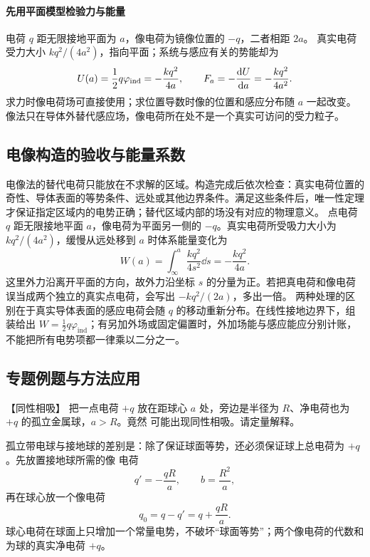 {%
\paragraph{先用平面模型检验力与能量}
电荷 $q$ 距无限接地平面为 $a$，像电荷为镜像位置的 $-q$，二者相距 $2a$。
真实电荷受力大小 $kq^2/(4a^2)$，指向平面；系统与感应有关的势能却为
\[
 U(a)=\frac12q\varphi_{\rm ind}=-\frac{kq^2}{4a},\qquad
 F_a=-\frac{\mathop{}\!\mathrm d U}{\mathop{}\!\mathrm d a}=-\frac{kq^2}{4a^2}.
\]
求力时像电荷场可直接使用；求位置导数时像的位置和感应分布随 $a$ 一起改变。像法只在导体外替代感应场，像电荷所在处不是一个真实可访问的受力粒子。


\subsection{电像构造的验收与能量系数}
电像法的替代电荷只能放在不求解的区域。构造完成后依次检查：真实电荷位置的奇性、导体表面的等势条件、远处或其他边界条件。满足这些条件后，唯一性定理才保证指定区域内的电势正确；替代区域内部的场没有对应的物理意义。
点电荷 $q$ 距无限接地平面 $a$，像电荷为平面另一侧的 $-q$。真实电荷所受吸力大小为 $kq^2/(4a^2)$，缓慢从远处移到 $a$ 时体系能量变化为
\[
 W(a)=\int_{\infty}^{a}\frac{kq^2}{4s^2}\dd s
 =-\frac{kq^2}{4a}.
\]
这里外力沿离开平面的方向，故外力沿坐标 $s$ 的分量为正。若把真电荷和像电荷误当成两个独立的真实点电荷，会写出 $-kq^2/(2a)$，多出一倍。
两种处理的区别在于真实导体表面的感应电荷会随 $q$ 的移动重新分布。在线性接地边界下，组装给出 $W=\tfrac12q\varphi_{\mathrm{ind}}$；有另加外场或固定偏置时，外加场能与感应能应分别计账，不能把所有电势项都一律乘以二分之一。


\subsection{专题例题与方法应用}

\begin{origexamplebox}{【同性相吸】}\label{ch20:ex:s34-3-4}
把一点电荷 $+q$ 放在距球心 $a$ 处，旁边是半径为 $R$、净电荷也为 $+q$ 的孤立金属球，$a>R$。竟然
可能出现同性相吸。请定量解释。

\ThQLikeAttraction
\end{origexamplebox}\par\nopagebreak[4]

\begin{xesolution}
孤立带电球与接地球的差别是：除了保证球面等势，还必须保证球上总电荷为 $+q$。先放置接地球所需的像
电荷
\[
  q'=-\frac{qR}{a},\qquad b=\frac{R^2}{a},
\]
再在球心放一个像电荷
\[
  q_0=q-q'=q+\frac{qR}{a}.
\]
球心电荷在球面上只增加一个常量电势，不破坏“球面等势”；两个像电荷的代数和为球的真实净电荷 $+q$。


\end{xesolution}}
